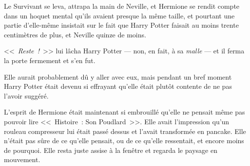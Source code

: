 Le Survivant se leva, attrapa la main de Neville, et Hermione se rendit compte dans un hoquet mental qu'ils avaient presque la même taille, et pourtant une partie d'elle-même insistait sur le fait que Harry Potter faisait au moins trente centimètres de plus, et Neville quinze de moins.

<<~\emph{Reste~!}~>> lui lâcha Harry Potter — non, en fait, à sa \emph{malle} — et il ferma la porte fermement et s'en fut.

Elle aurait probablement dû y aller avec eux, mais pendant un bref moment Harry Potter était devenu si effrayant qu'elle était plutôt contente de ne pas l'avoir suggéré.

L'esprit de Hermione était maintenant si embrouillé qu'elle ne pensait même pas pouvoir lire <<~Histoire~: Son Poudlard~>>. Elle avait l'impression qu'un rouleau compresseur lui était passé dessus et l'avait transformée en pancake. Elle n'était pas sûre de ce qu'elle pensait, ou de ce qu'elle ressentait, et encore moins de pourquoi. Elle resta juste assise à la fenêtre et regarda le paysage en mouvement.


